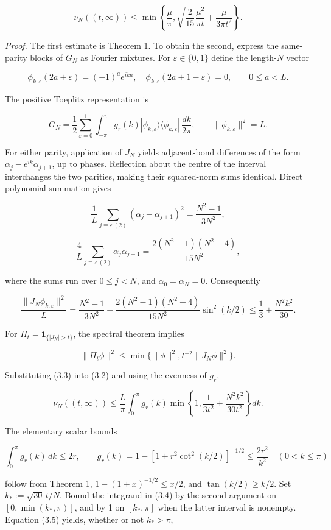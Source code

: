 \documentclass[
  10pt,
  a4paper,
]{article}
\begin{document}
\[
 \boxed{\nu_N((t,\infty))\le\min\left\{
 \frac\mu\pi,
 \sqrt{\frac2{15}}\frac{\mu^2}{\pi t}
 +\frac\mu{3\pi t^2}\right\}.}
 \tag{3.1}
\]

\emph{Proof.} The first estimate is Theorem 1. To obtain the second, express the same-parity blocks of \(G_N\) as Fourier mixtures. For \(\varepsilon\in\{0,1\}\) define the length-\(N\) vector

\[
 \phi_{k,\varepsilon}(2a+\varepsilon)=(-1)^a e^{ika},\quad
 \phi_{k,\varepsilon}(2a+1-\varepsilon)=0,\qquad 0\le a<L.
\]

The positive Toeplitz representation is

\[
 G_N=\frac12\sum_{\varepsilon=0}^1
 \int_{-\pi}^{\pi}g_r(k)
 |\phi_{k,\varepsilon}\rangle\langle\phi_{k,\varepsilon}|\,\frac{dk}{2\pi},
 \qquad \|\phi_{k,\varepsilon}\|^2=L.
 \tag{3.2}
\]

For either parity, application of \(J_N\) yields adjacent-bond differences of the form \(\alpha_j-e^{ik}\alpha_{j+1}\), up to phases. Reflection about the centre of the interval interchanges the two parities, making their squared-norm sums identical. Direct polynomial summation gives

\[
 \frac1L\sum_{j\equiv\varepsilon\, (2)}(\alpha_j-\alpha_{j+1})^2
 =\frac{N^2-1}{3N^2},
\]

\[
 \frac4L\sum_{j\equiv\varepsilon\, (2)}\alpha_j\alpha_{j+1}
 =\frac{2(N^2-1)(N^2-4)}{15N^2},
\]

where the sums run over \(0\le j<N\), and \(\alpha_0=\alpha_N=0\). Consequently

\[
 \frac{\|J_N\phi_{k,\varepsilon}\|^2}{L}
 =\frac{N^2-1}{3N^2}
 +\frac{2(N^2-1)(N^2-4)}{15N^2}\sin^2(k/2)
 \le\frac13+\frac{N^2k^2}{30}.
 \tag{3.3}
\]

For \(\Pi_t=\mathbf1_{\{|J_N|>t\}}\), the spectral theorem implies

\[
 \|\Pi_t\phi\|^2\le\min\{\|\phi\|^2,t^{-2}\|J_N\phi\|^2\}.
\]

Substituting (3.3) into (3.2) and using the evenness of \(g_r\),

\[
 \nu_N((t,\infty))\le\frac L\pi\int_0^\pi g_r(k)
 \min\left\{1,\frac1{3t^2}+\frac{N^2k^2}{30t^2}\right\}dk.
 \tag{3.4}
\]

The elementary scalar bounds

\[
 \int_0^\pi g_r(k)\,dk\le2r,
 \qquad
 g_r(k)=1-\left[1+r^2\cot^2(k/2)\right]^{-1/2}
 \le\frac{2r^2}{k^2}\quad (0<k\le\pi)
 \tag{3.5}
\]

follow from Theorem 1, \(1-(1+x)^{-1/2}\le x/2\), and \(\tan(k/2)\ge k/2\). Set \(k_*:=\sqrt{30}\,t/N\). Bound the integrand in (3.4) by the second argument on \([0,\min(k_*,\pi)]\), and by 1 on \([k_*,\pi]\) when the latter interval is nonempty. Equation (3.5) yields, whether or not \(k_*>\pi\),
\end{document}
